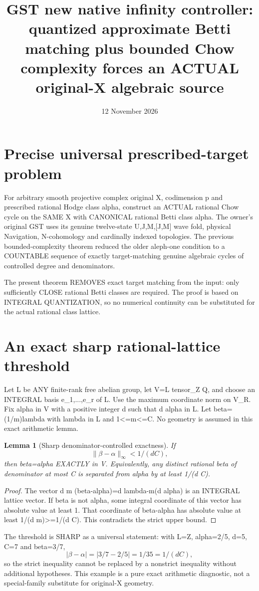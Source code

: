 \documentclass{article}
\title{GST new native infinity controller: quantized approximate Betti matching plus bounded Chow complexity forces an ACTUAL original-X algebraic source}
\date{12 November 2026}
\newtheorem{lemma}{Lemma}
\begin{document}
\maketitle

\section{Precise universal prescribed-target problem}
For arbitrary smooth projective complex original X, codimension p
and prescribed rational Hodge class alpha, construct an ACTUAL rational
Chow cycle on the SAME X with CANONICAL rational Betti class alpha.
The owner's original GST uses its genuine twelve-state U,J,M,[J,M]
wave fold, physical Navigation, N-cohomology and cardinally indexed
topologies. The previous bounded-complexity theorem reduced the older
aleph-one condition to a COUNTABLE sequence of exactly target-matching
genuine algebraic cycles of controlled degree and denominators.

The present theorem REMOVES exact target matching from the input:
only sufficiently CLOSE rational Betti classes are required.
The proof is based on INTEGRAL QUANTIZATION, so no numerical
continuity can be substituted for the actual rational class lattice.

\section{An exact sharp rational-lattice threshold}
Let L be ANY finite-rank free abelian group, let V=L tensor_Z Q,
and choose an INTEGRAL basis e_1,...,e_r of L.
Use the maximum coordinate norm on V_R.
Fix alpha in V with a positive integer d such that d alpha in L.
Let beta=(1/m)lambda with lambda in L and 1<=m<=C.
No geometry is assumed in this exact arithmetic lemma.

\begin{lemma}[Sharp denominator-controlled exactness]
If
\[
\boxed{\|\beta-\alpha\|_\infty<1/(d C),}
\]
then beta=alpha EXACTLY in V.
Equivalently, any distinct rational beta of denominator
at most C is separated from alpha by at least 1/(d C).
\end{lemma}
\begin{proof}
The vector d m (beta-alpha)=d lambda-m(d alpha)
is an INTEGRAL lattice vector. If beta is not alpha,
some integral coordinate of this vector has absolute
value at least 1. That coordinate of beta-alpha has
absolute value at least 1/(d m)>=1/(d C).
This contradicts the strict upper bound.
\end{proof}
The threshold is SHARP as a universal statement:
with L=Z, alpha=2/5, d=5, C=7 and beta=3/7,
\[
|\beta-\alpha|=|3/7-2/5|=1/35=1/(dC),
\]
so the strict inequality cannot be replaced by a
nonstrict inequality without additional hypotheses.
This example is a pure exact arithmetic diagnostic,
not a special-family substitute for original-X geometry.
\end{document}
